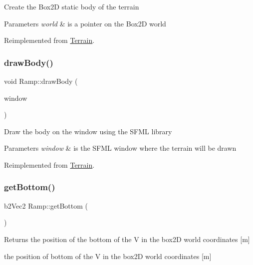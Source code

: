 Create the Box2D static body of the terrain 
\begin{DoxyParams}{Parameters}
{\em world} & is a pointer on the Box2D world \\
\hline
\end{DoxyParams}


Reimplemented from \mbox{\hyperlink{class_terrain_a97e007277f8abb9dde20ef2b49c38a3a}{Terrain}}.

\mbox{\label{class_ramp_ab05c0a8c5706488be4aba9c4f52f55c9}} 
\subsubsection{\texorpdfstring{draw\+Body()}{drawBody()}}
{\footnotesize\ttfamily void Ramp\+::draw\+Body (\begin{DoxyParamCaption}\item[{sf\+::\+Render\+Window \&}]{window }\end{DoxyParamCaption})\hspace{0.3cm}{\ttfamily [virtual]}}

Draw the body on the window using the S\+F\+ML library 
\begin{DoxyParams}{Parameters}
{\em window} & is the S\+F\+ML window where the terrain will be drawn \\
\hline
\end{DoxyParams}


Reimplemented from \mbox{\hyperlink{class_terrain_ae60571b91c1979fa94bdfc5002da6ac7}{Terrain}}.

\mbox{\label{class_ramp_a6e4926a2d16651162340113155e91e8f}} 
\subsubsection{\texorpdfstring{get\+Bottom()}{getBottom()}}
{\footnotesize\ttfamily b2\+Vec2 Ramp\+::get\+Bottom (\begin{DoxyParamCaption}{ }\end{DoxyParamCaption})\hspace{0.3cm}{\ttfamily [virtual]}}

\begin{DoxyReturn}{Returns}
the position of the bottom of the V in the box2D world coordinates \mbox{[}m\mbox{]}

the position of bottom of the V in the box2D world coordinates \mbox{[}m\mbox{]} 
\end{DoxyReturn}


